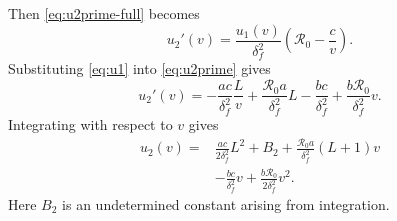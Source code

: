 \documentclass[11pt]{article}
\newcommand{\Rzero}{\mathcal R_0}
\begin{document}
Then \cref{eq:u2prime-full} becomes
\begin{equation}
u_2'(v)=\frac{u_1(v)}{\delta_f^2}\left(\Rzero-\frac{c}{v}\right).
\label{eq:u2prime}
\end{equation}
Substituting \cref{eq:u1} into \cref{eq:u2prime} gives
\[
u_2'(v)=-\frac{ac}{\delta_f^2}\frac{L}{v}
+\frac{\Rzero a}{\delta_f^2}L-\frac{bc}{\delta_f^2}
+\frac{b\Rzero}{\delta_f^2}v.
\]
Integrating with respect to \(v\) gives
\begin{equation}
\begin{split}
u_2(v)={}&\frac{ac}{2\delta_f^2}L^2+B_2
+\frac{\Rzero a}{\delta_f^2}(L+1)v\\
&-\frac{bc}{\delta_f^2}v+\frac{b\Rzero}{2\delta_f^2}v^2.
\end{split}
\label{eq:u2pre}
\end{equation}
Here \(B_2\) is an undetermined constant arising from integration.
\end{document}
